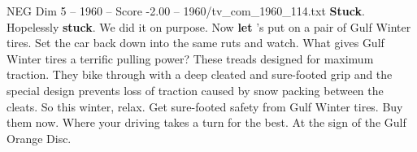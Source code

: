 \begin{textsample}{NEG Dim 5 – 1960 – Score -2.00 – 1960/tv\_com\_1960\_114.txt}  \label{ex:f5_neg_013}
\textbf{Stuck}.
Hopelessly \textbf{stuck}.
We did it on purpose.
Now \textbf{let} 's put on a pair of Gulf Winter tires.
Set the car back down into the same ruts and watch.
What gives Gulf Winter tires a terrific pulling power?
These treads designed for maximum traction.
They bike through with a deep cleated and sure-footed grip and the special design prevents loss of traction caused by snow packing between the cleats.
So this winter, relax.
Get sure-footed safety from Gulf Winter tires.
Buy them now.
Where your driving takes a turn for the best.
At the sign of the Gulf Orange Disc.

\end{textsample}
